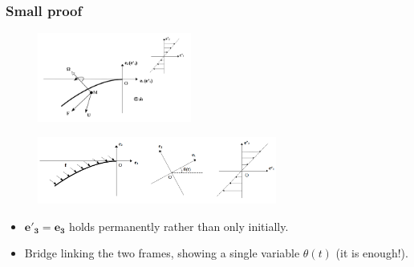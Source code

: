 \documentclass{beamer}
\newcommand{\bi}{\begin{itemize}}
\newcommand{\ei}{\end{itemize}}
\begin{document}
\begin{frame}
	\frametitle{Small proof}
	\begin{overlayarea}{\textwidth}{\textheight}
		\vspace{-0.3cm}	
		\begin{figure}[htb]
			\begin{center}
				\includegraphics[width=0.45\textwidth]{plots/relection_general.png}
			\end{center}
		\end{figure}
	\vspace{-0.3cm}
		\begin{figure}[htb]
		\begin{center}
			\includegraphics[width=0.7\textwidth]{plots/frames_general.png}
		\end{center}
	\end{figure}
		\bi
		\item $\mathbf{e'_3}=\mathbf{e_3}$ holds permanently rather than only initially.
		\item Bridge linking the two frames, showing a single variable $\theta(t)$ (it is enough!).
		\ei
	\end{overlayarea}
\end{frame}

\end{document}
